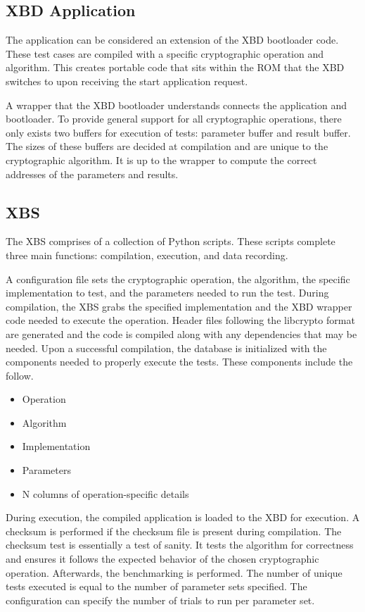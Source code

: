 \documentclass[10pt]{article}
\begin{document}
\subsection{XBD Application}
The application can be considered an extension of the XBD bootloader code. These test 
cases are compiled with a specific cryptographic operation and algorithm. This creates 
portable code that sits within the ROM that the XBD switches to upon receiving the start 
application request.

A wrapper that the XBD bootloader understands connects the application and bootloader. 
To provide general support for all cryptographic operations, there only exists two buffers 
for execution of tests: parameter buffer and result buffer. The sizes of these buffers 
are decided at compilation and are unique to the cryptographic algorithm. It is up to the 
wrapper to compute the correct addresses of the parameters and results.

\subsection{XBS}
The XBS comprises of a collection of Python scripts. These scripts complete three main 
functions: compilation, execution, and data recording. 

A configuration file sets the cryptographic operation, the algorithm, the specific 
implementation to test, and the parameters needed to run the test. During compilation, 
the XBS grabs the specified implementation and the XBD wrapper code needed to execute 
the operation. Header files following the libcrypto format are generated and the code 
is compiled along with any dependencies that may be needed.
Upon a successful compilation, the database is initialized with the components needed 
to properly execute the tests. These components include the follow.

\begin{itemize}
  \item Operation
  \item Algorithm
  \item Implementation
  \item Parameters
  \item N columns of operation-specific details
\end{itemize}

During execution, the compiled application is loaded to the XBD for execution. 
A checksum is performed if the checksum file is present during compilation. The checksum 
test is essentially a test of sanity. It tests the algorithm for correctness and ensures 
it follows the expected behavior of the chosen cryptographic operation. Afterwards, the 
benchmarking is performed. The number of unique tests executed is equal to the number of 
parameter sets specified. The configuration can specify the number of trials to run per 
parameter set.
\end{document}
